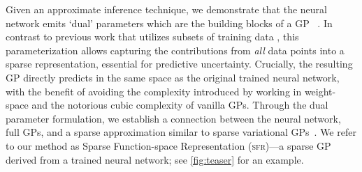\documentclass{article}
\makeatletter
\newcommand{\ie}{\textit{i.e.\@}\xspace}
\newcommand{\our}{\textsc{sfr}\xspace}
\makeatother
\begin{document}
Given an approximate inference technique, we demonstrate that the neural network emits `dual' parameters which are the building blocks of a GP~\citep{csato2002sparse, adam2021dual, chang2020fast} . In contrast to previous work that utilizes subsets of training data \citep{immer2021scalable}, this parameterization allows capturing the contributions from {\em all} data points into a sparse representation, essential for predictive uncertainty. Crucially, the resulting GP directly predicts in the same space as the original trained neural network, with the benefit of avoiding the complexity introduced by working in weight-space and the notorious cubic complexity of vanilla GPs.
Through the dual parameter formulation, we establish a connection between the neural network, full GPs, and a sparse approximation similar to sparse variational GPs~\citep{titsias2009variational}. We refer to our method as Sparse Function-space Representation (\our)---a sparse GP derived from a trained neural network; see \cref{fig:teaser} for an example. %
\end{document}
